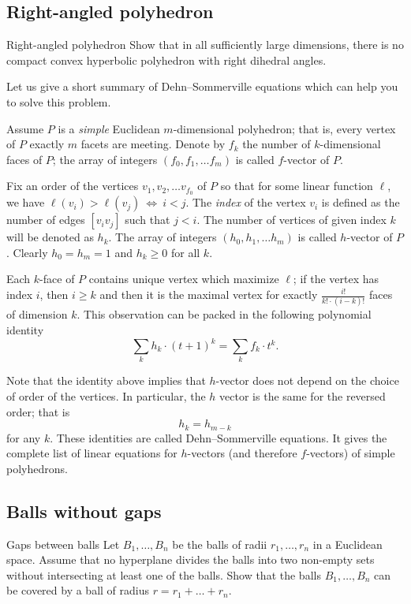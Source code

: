 \subsection*{Right-angled polyhedron\thm}

\begin{pr}{\thm}{Right-angled polyhedron}\label{Right-angled polyhedron}
Show that in all sufficiently large dimensions, there is no compact convex hyperbolic polyhedron with right dihedral angles. 
\end{pr}

Let us give a short summary of Dehn--Sommerville equations 
which can help you to solve this problem.

Assume $P$ is a \emph{simple} Euclidean $m$-dimensional polyhedron;
that is, every vertex of $P$ exactly $m$ facets are meeting.
Denote by $f_k$ the number of $k$-dimensional faces of $P$;
the array of integers $(f_0,f_1,\dots f_m)$ is called $f$-vector of $P$.

Fix an order of the vertices $v_1,v_2,\dots v_{f_0}$
of $P$ so that for some linear function $\ell$, we have $\ell(v_i)>\ell(v_j)\ \Leftrightarrow\ i<j$.
The \emph{index} of the vertex $v_i$ 
is defined as the number of edges $[v_iv_j]$ such that $j<i$. 
The number of vertices of given index $k$ will be denoted as $h_k$.
The array of integers $(h_0,h_1,\dots h_m)$ is called $h$-vector of $P$.
Clearly $h_0=h_m=1$ and $h_k\ge 0$ for all $k$.

Each $k$-face of $P$ contains unique vertex which maximize $\ell$;
if the vertex has index $i$,
then $i\ge k$ and
then it is the maximal vertex for exactly $\tfrac{i!}{k!\cdot (i-k)!}$
faces of dimension $k$.
This observation can be packed in the following polynomial identity 
\[\sum_k h_k\cdot (t+1)^k=\sum_k f_k\cdot t^k.\]

Note that the identity above implies that $h$-vector does not depend on the choice of order of the vertices.
In particular, the $h$ vector is the same for the reversed order;
that is
\[h_k=h_{m-k}\]
for any $k$.
These identities are called Dehn--Sommerville equations.
It gives the complete list of linear equations for $h$-vectors (and therefore $f$-vectors) of simple polyhedrons.

\subsection*{Balls without gaps}
\label{Balls without gaps}
\begin{pr}{}{Gaps between balls}
Let $B_1,\dots,B_n$ be the balls  
of radii $r_1,\dots,r_n$ 
in a Euclidean space.
Assume that no hyperplane divides the balls into two
non-empty sets without intersecting at least one of the balls. 
Show that the balls
$B_1,\dots,B_n$ can be covered by a ball of radius
$r=r_1+\dots+r_n$.

\end{pr}



